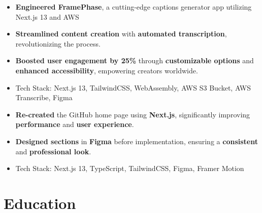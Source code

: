 \documentclass[11pt,a4paper,sans]{moderncv}
\begin{document}
{
\begin{itemize}[leftmargin=0.6cm, label={\textbullet}]
    \item \textbf{Engineered FramePhase}, a cutting-edge captions generator app utilizing Next.js 13 and AWS
    \item \textbf{Streamlined content creation} with \textbf{automated transcription}, revolutionizing the process.
    \item \textbf{Boosted user engagement by 25\%} through \textbf{customizable options} and \textbf{enhanced accessibility}, empowering creators worldwide.
    \item Tech Stack: Next.js 13, TailwindCSS, WebAssembly, AWS S3 Bucket, AWS Transcribe, Figma
\end{itemize}
}

{
\begin{itemize}[leftmargin=0.6cm, label={\textbullet}]
    \item \textbf{Re-created} the GitHub home page using \textbf{Next.js}, significantly improving \textbf{performance} and \textbf{user experience}.
    \item \textbf{Designed sections} in \textbf{Figma} before implementation, ensuring a \textbf{consistent} and \textbf{professional look}.
    \item Tech Stack: Next.js 13, TypeScript, TailwindCSS, Figma, Framer Motion
\end{itemize}
}

\section{Education}
\end{document}
